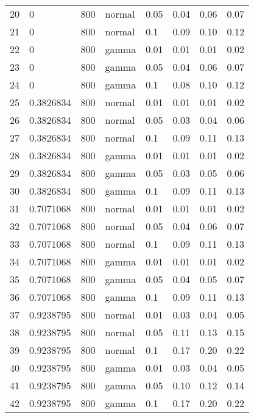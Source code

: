 \begin{table}[ht]
\begin{tabular}{rllllrrr}
  20 & 0 & 800 & normal & 0.05 & 0.04 & 0.06 & 0.07 \\ 
  21 & 0 & 800 & normal & 0.1 & 0.09 & 0.10 & 0.12 \\ 
  22 & 0 & 800 & gamma & 0.01 & 0.01 & 0.01 & 0.02 \\ 
  23 & 0 & 800 & gamma & 0.05 & 0.04 & 0.06 & 0.07 \\ 
  24 & 0 & 800 & gamma & 0.1 & 0.08 & 0.10 & 0.12 \\ 
  25 & 0.3826834 & 800 & normal & 0.01 & 0.01 & 0.01 & 0.02 \\ 
  26 & 0.3826834 & 800 & normal & 0.05 & 0.03 & 0.04 & 0.06 \\ 
  27 & 0.3826834 & 800 & normal & 0.1 & 0.09 & 0.11 & 0.13 \\ 
  28 & 0.3826834 & 800 & gamma & 0.01 & 0.01 & 0.01 & 0.02 \\ 
  29 & 0.3826834 & 800 & gamma & 0.05 & 0.03 & 0.05 & 0.06 \\ 
  30 & 0.3826834 & 800 & gamma & 0.1 & 0.09 & 0.11 & 0.13 \\ 
  31 & 0.7071068 & 800 & normal & 0.01 & 0.01 & 0.01 & 0.02 \\ 
  32 & 0.7071068 & 800 & normal & 0.05 & 0.04 & 0.06 & 0.07 \\ 
  33 & 0.7071068 & 800 & normal & 0.1 & 0.09 & 0.11 & 0.13 \\ 
  34 & 0.7071068 & 800 & gamma & 0.01 & 0.01 & 0.01 & 0.02 \\ 
  35 & 0.7071068 & 800 & gamma & 0.05 & 0.04 & 0.05 & 0.07 \\ 
  36 & 0.7071068 & 800 & gamma & 0.1 & 0.09 & 0.11 & 0.13 \\ 
  37 & 0.9238795 & 800 & normal & 0.01 & 0.03 & 0.04 & 0.05 \\ 
  38 & 0.9238795 & 800 & normal & 0.05 & 0.11 & 0.13 & 0.15 \\ 
  39 & 0.9238795 & 800 & normal & 0.1 & 0.17 & 0.20 & 0.22 \\ 
  40 & 0.9238795 & 800 & gamma & 0.01 & 0.03 & 0.04 & 0.05 \\ 
  41 & 0.9238795 & 800 & gamma & 0.05 & 0.10 & 0.12 & 0.14 \\ 
  42 & 0.9238795 & 800 & gamma & 0.1 & 0.17 & 0.20 & 0.22 \\ 
   \hline
\end{tabular}
\end{table}

